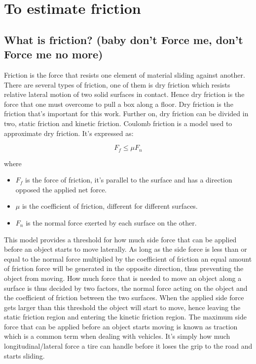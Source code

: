 \chapter{To estimate friction}

\section{What is friction? (baby don't Force me, don't Force me no more)}
Friction is the force that resists one element of material sliding against another. There are several types of friction, one of them is dry friction which resists relative lateral motion of two solid surfaces in contact. Hence dry friction is the force that one must overcome to pull a box along a floor. Dry friction is the friction that's important for this work. Further on, dry friction can be divided in two, static friction and kinetic friction. Coulomb friction is a model used to approximate dry friction. It's expressed as:

\begin{equation} \label{eq:friction}
F_{f}\leq\mu F_{n}
\end{equation}

where

\begin{itemize}
	\item $ F_{f} $ is the force of friction, it's parallel to the surface and has a direction opposed the applied net force.
	\item $ \mu $ is the coefficient of friction, different for different surfaces.
	\item $ F_{n} $ is the normal force exerted by each surface on the other.
\end{itemize}

This model provides a threshold for how much side force that can be applied before an object starts to move laterally. As long as the side force is less than or equal to the normal force multiplied by the coefficient of friction an equal amount of friction force will be generated in the opposite direction, thus preventing the object from moving. How much force that is needed to move an object along a surface is thus decided by two factors, the normal force acting on the object and the coefficient of friction between the two surfaces. When the applied side force gets larger than this threshold the object will start to move, hence leaving the static friction region and entering the kinetic friction region. The maximum side force that can be applied before an object starts moving is known as traction which is a common term when dealing with vehicles. It's simply how much longitudinal/lateral force a tire can handle before it loses the grip to the road and starts sliding.

